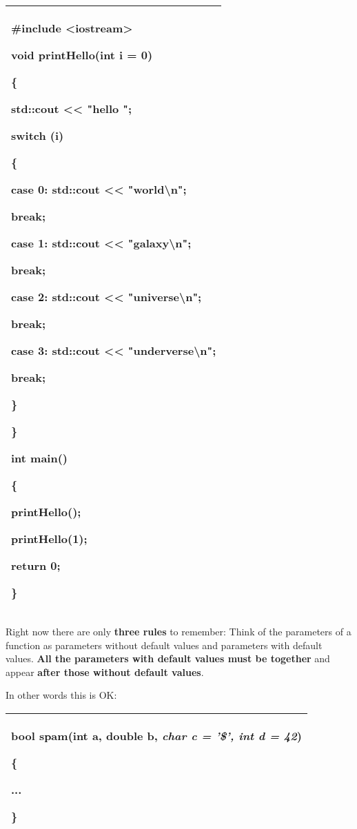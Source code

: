 \documentclass[
]{article}
\begin{document}
\begin{longtable}[]{@{}l@{}}
\toprule
\endhead
\begin{minipage}[t]{0.97\columnwidth}\raggedright
\#include \textless iostream\textgreater{}

void printHello(int i = 0)

\{

std::cout \textless\textless{} "hello ";

switch (i)

\{

case 0: std::cout \textless\textless{} "world\textbackslash n";

break;

case 1: std::cout \textless\textless{} "galaxy\textbackslash n";

break;

case 2: std::cout \textless\textless{} "universe\textbackslash n";

break;

case 3: std::cout \textless\textless{} "underverse\textbackslash n";

break;

\}

\}

int main()

\{

printHello();

printHello(1);

return 0;

\}\strut
\end{minipage}\tabularnewline
\bottomrule
\end{longtable}

Right now there are only \textbf{three rules} to remember: Think of the
parameters of a function as parameters without default values and
parameters with default values. \textbf{All the parameters with default
values must be together} and appear \textbf{after those without default
values}.

In other words this is OK:

\begin{longtable}[]{@{}l@{}}
\toprule
\endhead
\begin{minipage}[t]{0.97\columnwidth}\raggedright
bool spam(int a, double b, \emph{\textbf{char c = '\$', int d = 42}})

\{

...

\}\strut
\end{minipage}\tabularnewline
\bottomrule
\end{longtable}
\end{document}
